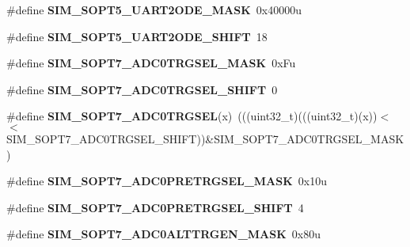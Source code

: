 \begin{DoxyCompactItemize}
\#define {\bfseries S\+I\+M\+\_\+\+S\+O\+P\+T5\+\_\+\+U\+A\+R\+T2\+O\+D\+E\+\_\+\+M\+A\+SK}~0x40000u
\item 
\mbox{\label{group___s_i_m___register___masks_gad3283784bd7916c036b2299401fa7468}} 
\#define {\bfseries S\+I\+M\+\_\+\+S\+O\+P\+T5\+\_\+\+U\+A\+R\+T2\+O\+D\+E\+\_\+\+S\+H\+I\+FT}~18
\item 
\mbox{\label{group___s_i_m___register___masks_gaeda70babef834cacace2c775d62bb4ae}} 
\#define {\bfseries S\+I\+M\+\_\+\+S\+O\+P\+T7\+\_\+\+A\+D\+C0\+T\+R\+G\+S\+E\+L\+\_\+\+M\+A\+SK}~0x\+Fu
\item 
\mbox{\label{group___s_i_m___register___masks_ga914ced2a5cf4e7f37371d52d34d4a930}} 
\#define {\bfseries S\+I\+M\+\_\+\+S\+O\+P\+T7\+\_\+\+A\+D\+C0\+T\+R\+G\+S\+E\+L\+\_\+\+S\+H\+I\+FT}~0
\item 
\mbox{\label{group___s_i_m___register___masks_gab4fec73a0cfeecaa863fc29f85326f4a}} 
\#define {\bfseries S\+I\+M\+\_\+\+S\+O\+P\+T7\+\_\+\+A\+D\+C0\+T\+R\+G\+S\+EL}(x)~(((uint32\+\_\+t)(((uint32\+\_\+t)(x))$<$$<$S\+I\+M\+\_\+\+S\+O\+P\+T7\+\_\+\+A\+D\+C0\+T\+R\+G\+S\+E\+L\+\_\+\+S\+H\+I\+FT))\&S\+I\+M\+\_\+\+S\+O\+P\+T7\+\_\+\+A\+D\+C0\+T\+R\+G\+S\+E\+L\+\_\+\+M\+A\+SK)
\item 
\mbox{\label{group___s_i_m___register___masks_ga74544c6c9d4fbc593884681ac79c796f}} 
\#define {\bfseries S\+I\+M\+\_\+\+S\+O\+P\+T7\+\_\+\+A\+D\+C0\+P\+R\+E\+T\+R\+G\+S\+E\+L\+\_\+\+M\+A\+SK}~0x10u
\item 
\mbox{\label{group___s_i_m___register___masks_gaee870f942318f14376ee9e6d5558e2ff}} 
\#define {\bfseries S\+I\+M\+\_\+\+S\+O\+P\+T7\+\_\+\+A\+D\+C0\+P\+R\+E\+T\+R\+G\+S\+E\+L\+\_\+\+S\+H\+I\+FT}~4
\item 
\mbox{\label{group___s_i_m___register___masks_ga6390cd75db35ecc6c5fc6d5b0d417a7d}} 
\#define {\bfseries S\+I\+M\+\_\+\+S\+O\+P\+T7\+\_\+\+A\+D\+C0\+A\+L\+T\+T\+R\+G\+E\+N\+\_\+\+M\+A\+SK}~0x80u
\item 
\mbox{\label{group___s_i_m___register___masks_gaa20ed5f5ab9cf02714a993c3996adcc5}} 
$$
\end{DoxyCompactItemize}
